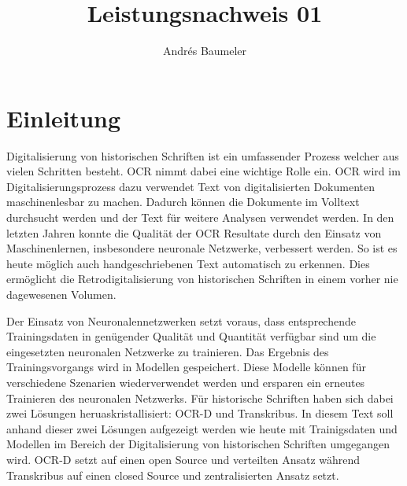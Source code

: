 \documentclass[a4paper,oneside, 12pt]{report}
\title{Leistungsnachweis 01}
\author{Andrés Baumeler}
\begin{document}

\pagestyle{empty} %





\cleardoublepage
\tableofcontents %
\cleardoublepage %

\pagestyle{plain} %



\chapter{Einleitung}\label{sec:motivation}
Digitalisierung von historischen Schriften ist ein umfassender Prozess welcher aus vielen Schritten besteht. \ac{OCR} nimmt dabei eine wichtige Rolle ein. \ac{OCR}  wird im Digitalisierungsprozess dazu verwendet Text von digitalisierten Dokumenten maschinenlesbar zu machen. Dadurch können die Dokumente im Volltext durchsucht werden und der Text für weitere Analysen verwendet werden. In den letzten Jahren konnte die Qualität der OCR Resultate durch den Einsatz von Maschinenlernen, insbesondere neuronale Netzwerke, verbessert werden. So ist es heute möglich auch handgeschriebenen Text automatisch zu erkennen. Dies ermöglicht die Retrodigitalisierung von historischen Schriften in einem vorher nie dagewesenen Volumen. 

Der Einsatz von Neuronalennetzwerken setzt voraus, dass entsprechende Trainingsdaten in genügender Qualität und Quantität verfügbar sind um die eingesetzten neuronalen Netzwerke zu trainieren. Das Ergebnis des Trainingsvorgangs wird in Modellen gespeichert. Diese Modelle können für verschiedene Szenarien wiederverwendet werden und ersparen ein erneutes Trainieren des neuronalen Netzwerks. 
Für historische Schriften haben sich dabei zwei Lösungen heruaskristallisiert: OCR-D und Transkribus. In diesem Text soll anhand dieser zwei Lösungen aufgezeigt werden wie heute mit Trainigsdaten und Modellen im Bereich der Digitalisierung von historischen Schriften umgegangen wird. OCR-D setzt auf einen open Source und verteilten Ansatz während Transkribus auf einen closed Source und zentralisierten Ansatz setzt.
\end{document}
